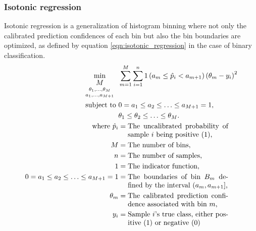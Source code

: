 \subsubsection{Isotonic regression}
Isotonic regression is a generalization of histogram binning where not only the calibrated prediction confidences of each bin but also the bin boundaries are optimized, as defined by equation \ref{eqn:isotonic_regression} in the case of binary classification.
\begin{align}
  \label{eqn:isotonic_regression}
  \min _{
    \begin{array}{c}
      M \\
	  \genfrac{}{}{0pt}{}{\theta_{1}, \ldots, \theta_{M}}{a_{1}, \ldots, a_{M+1}}
    \end{array}
  } & \sum_{m = 1}^{M} \sum_{i = 1}^{n} 1\left(a_{m} \leq \hat{p}_{i} < a_{m + 1}\right)\left(\theta_{m} - y_{i}\right)^{2} \\ \nonumber
  \text{ subject to } & 0 = a_{1} \leq a_{2} \leq \ldots \leq a_{M + 1}=1, \\ \nonumber
  & \theta_{1} \leq \theta_{2} \leq \ldots \leq \theta_{M}. \\ \nonumber
  \text{where}~\hat{p}_{i} &= \parbox[t]{5cm}{The uncalibrated probability of sample $i$ being positive (1),} \\ \nonumber
  M &= \text{The number of bins}, \\ \nonumber
  n &= \text{The number of samples}, \\ \nonumber
  1 &= \text{The indicator function}, \\ \nonumber
  0=a_{1} \leq a_{2} \leq \ldots \leq a_{M+1}=1 &= \parbox[t]{5cm}{The boundaries of bin $B_{m}$ defined by the interval $\left(a_{m}, a_{m+1}\right]$,} \\ \nonumber
  \theta_{m} &= \parbox[t]{5cm}{The calibrated prediction confidence associated with bin $m$,} \\ \nonumber
  y_{i} &= \parbox[t]{5cm}{Sample $i$'s true class, either positive (1) or negative (0)}
\end{align}

